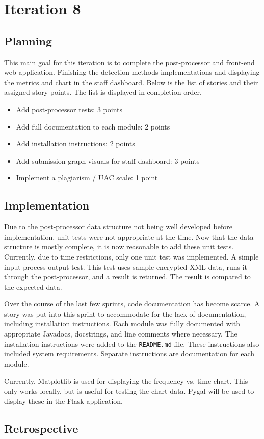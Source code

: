 \chapter{Iteration 8}
\section{Planning}
This main goal for this iteration is to complete the post-processor and front-end web application. Finishing the detection methods implementations and displaying the metrics and chart in the staff dashboard. Below is the list of stories and their assigned story points. The list is displayed in completion order.

\begin{itemize}
\item Add post-processor tests: 3 points
\item Add full documentation to each module: 2 points
\item Add installation instructions: 2 points
\item Add submission graph visuals for staff dashboard: 3 points
\item Implement a plagiarism / UAC scale: 1 point
\end{itemize}

\section{Implementation}
Due to the post-processor data structure not being well developed before implementation, unit tests were not appropriate at the time. Now that the data structure is mostly complete, it is now reasonable to add these unit tests. Currently, due to time restrictions, only one unit test was implemented. A simple input-process-output test. This test uses sample encrypted XML data, runs it through the post-processor, and a result is returned. The result is compared to the expected data.

Over the course of the last few sprints, code documentation has become scarce. A story was put into this sprint to accommodate for the lack of documentation, including installation instructions. Each module was fully documented with appropriate Javadocs, docstrings, and line comments where necessary. The installation instructions were added to the \texttt{README.md} file. These instructions also included system requirements. Separate instructions are documentation for each module.

Currently, Matplotlib is used for displaying the frequency vs. time chart. This only works locally, but is useful for testing the chart data. Pygal will be used to display these in the Flask application\cite{PygalFlask}.

\section{Retrospective}

